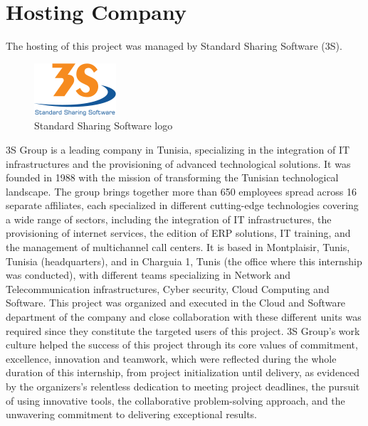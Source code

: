 \section{Hosting Company}
The hosting of this project was managed by Standard Sharing Software (3S).
\smallskip\newline
\begin{figure}[htbp]
    \centering
    \includegraphics[width=0.4\linewidth]{./figures/logo_3S.png}
    \caption{Standard Sharing Software logo}
\end{figure}\newline
3S Group is a leading company in Tunisia, specializing in the integration of IT infrastructures and the provisioning of advanced technological solutions. It was founded in 1988 with the mission of transforming the Tunisian technological landscape. The group brings together more than 650 employees spread across 16 separate affiliates, each specialized in different cutting-edge technologies covering a wide range of sectors, including the integration of IT infrastructures, the provisioning of internet services, the edition of ERP solutions, IT training, and the management of multichannel call centers.\newline
It is based in Montplaisir, Tunis, Tunisia (headquarters), and in Charguia 1, Tunis (the office where this internship was conducted), with different teams specializing in Network and Telecommunication infrastructures, Cyber security, Cloud Computing and Software. This project was organized and executed in the Cloud and Software department of the company and close collaboration with these different units was required since they constitute the targeted users of this project.\newline
3S Group's work culture helped the success of this project through its core values of commitment, excellence, innovation and teamwork, which were reflected during the whole duration of this internship, from project initialization until delivery, as evidenced by the organizers's relentless dedication to meeting project deadlines, the pursuit of using innovative tools, the collaborative problem-solving approach, and the unwavering commitment to delivering exceptional results.
\newpage

